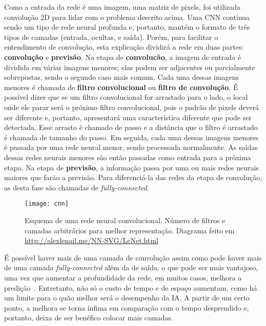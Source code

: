 Como a entrada da rede é uma imagem, uma matriz de pixels, foi utilizada convolução 2D para lidar com o problema descrito acima.
Uma CNN continua sendo um tipo de rede neural profunda e, portanto, mantém o formato de três tipos de camadas (entrada, ocultas, e saída). Porém, para facilitar o entendimento de convolução, esta explicação dividirá a rede em duas partes: \textbf{convolução} e \textbf{previsão}.
Na etapa de \textbf{convolucão}, a imagem de entrada é dividida em várias imagens menores; elas podem ser adjacentes ou parcialmente sobrepostas, sendo o segundo caso mais comum.
Cada uma dessas imagens menores é chamada de \textbf{filtro convolucional} ou \textbf{filtro de convolução}.
É possível dizer que se um filtro convolucional for arrastado para o lado, o local onde ele parar será o próximo filtro convolucional, pois o padrão de pixels deverá ser diferente e, portanto, apresentará uma característica diferente que pode ser detectada.
Esse arrasto é chamado de passo e a distância que o filtro é arrastado é chamada de tamanho do passo.
Em seguida, cada uma dessas imagens menores é passada por uma rede neural menor, sendo processada normalmente.
As saídas dessas redes neurais menores são então passadas como entrada para a próxima etapa.
Na etapa de \textbf{previsão}, a informação passa por uma ou mais redes neurais maiores que farão a previsão. Para diferenciá-la das redes da etapa de convolução, as desta fase são chamadas de \textit{fully-connected}.

\begin{figure}[h!]
\texttt{[image: cnn]}
\centering
\caption{Esquema de uma rede neural convolucional. Número de filtros e camadas arbitrários para melhor representação. Diagrama feito em \url{http://alexlenail.me/NN-SVG/LeNet.html}}
\end{figure}

É possível haver mais de uma camada de convolução assim como pode haver mais de uma camada \textit{fully-connected} além da de saída, o que pode ser mais vantajoso, uma vez que aumentar a profundidade da rede, em muitos casos, melhora a predição~\cite{Goodfellow-et-al-2016}.
Entretanto, não só o custo de tempo e de espaço aumentam, como há um limite para o quão melhor será o desempenho da IA.
A partir de um certo ponto, a melhora se torna ínfima em comparação com o tempo desprendido e, portanto, deixa de ser benéfico colocar mais camadas.

